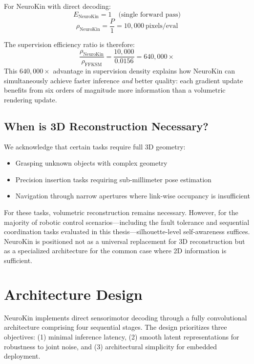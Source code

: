 \documentclass[12pt,a4paper,oneside]{report}
\begin{document}
For NeuroKin with direct decoding:
\begin{equation}
E_{\text{NeuroKin}} = 1 \quad \text{(single forward pass)}
\end{equation}
\begin{equation}
\rho_{\text{NeuroKin}} = \frac{P}{1} = 10,000\ \text{pixels/eval}
\end{equation}

The supervision efficiency ratio is therefore:
\begin{equation}
\frac{\rho_{\text{NeuroKin}}}{\rho_{\text{FFKSM}}} = \frac{10,000}{0.0156} = 640,000\times
\end{equation}
This $640,000\times$ advantage in supervision density explains how NeuroKin can simultaneously achieve faster inference \textit{and} better quality: each gradient update benefits from six orders of magnitude more information than a volumetric rendering update.

\subsection{When is 3D Reconstruction Necessary?}
We acknowledge that certain tasks require full 3D geometry:
\begin{itemize}
    \item Grasping unknown objects with complex geometry
    \item Precision insertion tasks requiring sub-millimeter pose estimation
    \item Navigation through narrow apertures where link-wise occupancy is insufficient
\end{itemize}
For these tasks, volumetric reconstruction remains necessary. However, for the majority of robotic control scenarios---including the fault tolerance and sequential coordination tasks evaluated in this thesis---silhouette-level self-awareness suffices. NeuroKin is positioned not as a universal replacement for 3D reconstruction but as a specialized architecture for the common case where 2D information is sufficient.

\section{Architecture Design}
\label{sec:architecture_design_decoder}

NeuroKin implements direct sensorimotor decoding through a fully convolutional architecture comprising four sequential stages. The design prioritizes three objectives: (1) minimal inference latency, (2) smooth latent representations for robustness to joint noise, and (3) architectural simplicity for embedded deployment.
\end{document}
